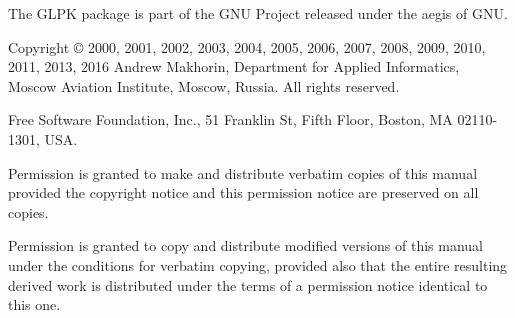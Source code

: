 \documentclass[11pt]{report}
\begin{document}
\thispagestyle{empty}


\newpage

\vspace*{1in}

\vfill

\noindent
The GLPK package is part of the GNU Project released under the aegis of
GNU.

\noindent
Copyright \copyright{} 2000, 2001, 2002, 2003, 2004, 2005, 2006, 2007,
2008, 2009, 2010, 2011, 2013, 2016\linebreak
Andrew Makhorin, Department for Applied Informatics, Moscow Aviation
Institute, Moscow, Russia. All rights reserved.

\noindent
Free Software Foundation, Inc., 51 Franklin St, Fifth Floor, Boston, MA
02110-1301, USA.

\noindent
Permission is granted to make and distribute verbatim copies of this
manual provided the copyright notice and this permission notice are
preserved on all copies.

\noindent
Permission is granted to copy and distribute modified versions of this
manual under the conditions for verbatim copying, provided also that the
entire resulting derived work is distributed under the terms of
a permission notice identical to this one.
\end{document}
